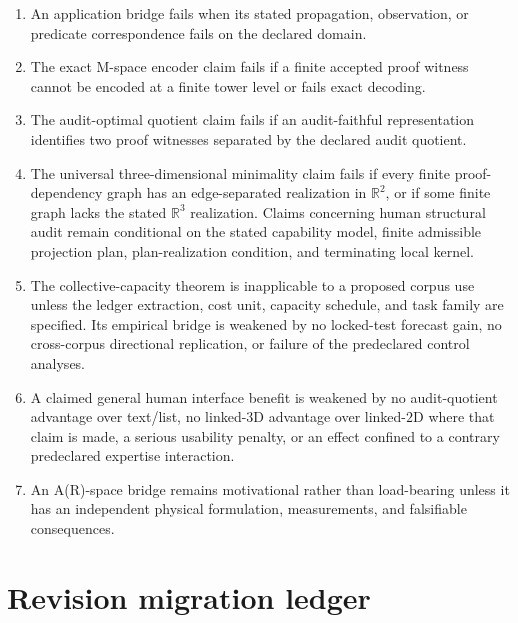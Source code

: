 \documentclass[11pt]{article}
\theoremstyle{plain}
\theoremstyle{definition}
\theoremstyle{remark}
\begin{document}
\begin{enumerate}[label=\textbf{F\arabic*.},leftmargin=2.6em]
\item An application bridge fails when its stated propagation, observation, or
predicate correspondence fails on the declared domain.
\item The exact M-space encoder claim fails if a finite accepted proof witness
cannot be encoded at a finite tower level or fails exact decoding.
\item The audit-optimal quotient claim fails if an audit-faithful representation
identifies two proof witnesses separated by the declared audit quotient.
\item The universal three-dimensional minimality claim fails if every finite
proof-dependency graph has an edge-separated realization in $\mathbb R^2$, or if
some finite graph lacks the stated $\mathbb R^3$ realization.  Claims concerning human structural audit remain conditional on the stated
capability model, finite admissible projection plan, plan-realization condition,
and terminating local kernel.
\item The collective-capacity theorem is inapplicable to a proposed corpus use
unless the ledger extraction, cost unit, capacity schedule, and task family are
specified.  Its empirical bridge is weakened by no locked-test forecast gain,
no cross-corpus directional replication, or failure of the predeclared control
analyses.
\item A claimed general human interface benefit is weakened by no audit-quotient
advantage over text/list, no linked-$3$D advantage over linked-$2$D where that
claim is made, a serious usability penalty, or an effect confined to a contrary
predeclared expertise interaction.
\item An A(R)-space bridge remains motivational rather than load-bearing unless it
has an independent physical formulation, measurements, and falsifiable
consequences.
\end{enumerate}

\section{Revision migration ledger}
\label{sec:removed}
\end{document}
